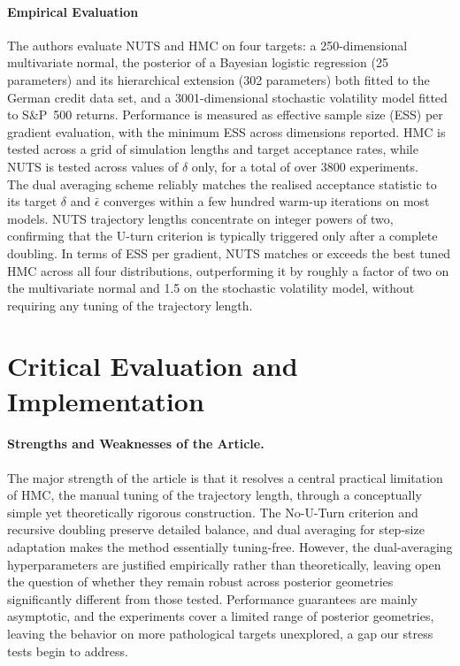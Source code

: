 \documentclass{article}
\begin{document}
\paragraph{Empirical Evaluation}
The authors evaluate NUTS and HMC on four targets: a 250-dimensional multivariate normal, the posterior of a Bayesian logistic regression (25 parameters) and its hierarchical extension (302 parameters) both fitted to the German credit data set, and a 3001-dimensional stochastic volatility model fitted to S\&P~500 returns. Performance is measured as effective sample size (ESS) per gradient evaluation, with the minimum ESS across dimensions reported. HMC is tested across a grid of simulation lengths and target acceptance rates, while NUTS is tested across values of $\delta$ only, for a total of over 3800 experiments. \\
The dual averaging scheme reliably matches the realised acceptance statistic to its target $\delta$ and $\bar{\epsilon}$ converges within a few hundred warm-up iterations on most models. NUTS trajectory lengths concentrate on integer powers of two, confirming that the U-turn criterion is typically triggered only after a complete doubling. In terms of ESS per gradient, NUTS matches or exceeds the best tuned HMC across all four distributions, outperforming it by roughly a factor of two on the multivariate normal and 1.5 on the stochastic volatility model, without requiring any tuning of the trajectory length.


\section{Critical Evaluation and Implementation}

\paragraph{Strengths and Weaknesses of the Article.}
The major strength of the article is that it resolves a central practical limitation of HMC, the manual tuning of the trajectory length, through a conceptually simple yet theoretically rigorous construction. The No-U-Turn criterion and recursive doubling preserve detailed balance, and dual averaging for step-size adaptation makes the method essentially tuning-free. However, the dual-averaging hyperparameters are justified empirically rather than theoretically, leaving open the question of whether they remain robust across posterior geometries significantly different from those tested. Performance guarantees are mainly asymptotic, and the experiments cover a limited range of posterior geometries, leaving the behavior on more pathological targets unexplored, a gap our stress tests begin to address.
\end{document}

